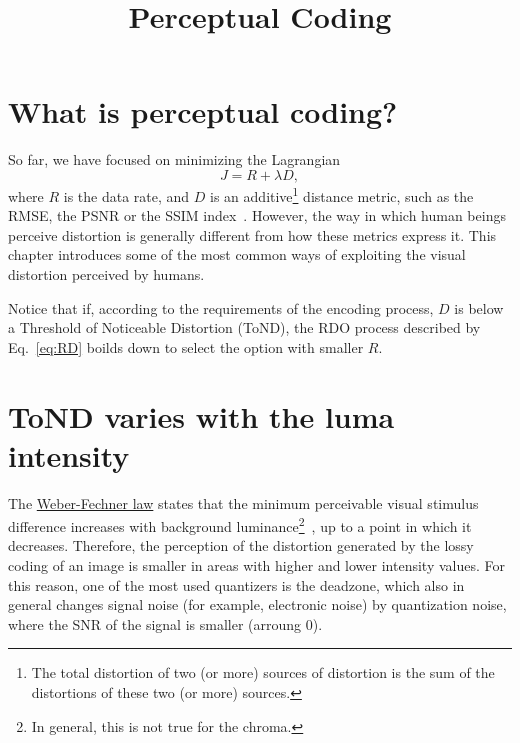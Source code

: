 

\title{Perceptual Coding}

\maketitle
\tableofcontents

\section{What is perceptual coding?}

So far, we have focused on minimizing the
Lagrangian~\cite{sullivan1998rate}
\begin{equation}
  J = R + \lambda D,
  \label{eq:RD}
\end{equation}
where $R$ is the data rate, and $D$ is an additive\footnote{The total
distortion of two (or more) sources of distortion is the sum of the
distortions of these two (or more) sources.} distance metric, such as
the RMSE, the PSNR or the SSIM index~\cite{wang2004image}. However, the
way in which human beings perceive distortion is generally different
from how these metrics express it. This chapter introduces some of the
most common ways of exploiting the visual distortion perceived by
humans.

Notice that if, according to the requirements of the encoding process, $D$ is below
a Threshold of Noticeable Distortion (ToND), the RDO process described
by Eq.~\eqref{eq:RD} boilds down to select the option with smaller $R$.

\section{ToND varies with the luma intensity}

The \href{https://en.wikipedia.org/wiki/Weber%E2%80%93Fechner_law}{Weber-Fechner law} states that the minimum perceivable visual
stimulus difference increases with background
luminance\footnote{In general, this is not true for the
chroma.}~\cite{naccari2014perceptually}, up to a point in which it
decreases. Therefore, the perception of the distortion generated by
the lossy coding of an image is smaller in areas with higher and
lower intensity values. For this reason, one of the most used
quantizers is the deadzone, which also in general changes signal noise
(for example, electronic noise) by quantization noise, where the SNR
of the signal is smaller (arroung 0).

